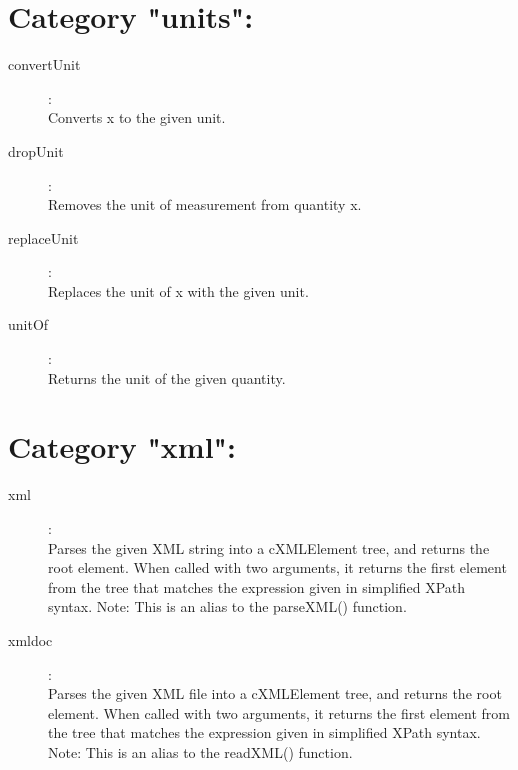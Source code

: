 \section{Category "units":}
\label{sec:ned-functions:category-units}

\begin{description}
\item[convertUnit]:  \\
    Converts x to the given unit.

\item[dropUnit]:  \\
    Removes the unit of measurement from quantity x.

\item[replaceUnit]:  \\
    Replaces the unit of x with the given unit.

\item[unitOf]:  \\
    Returns the unit of the given quantity.


\end{description}

\section{Category "xml":}
\label{sec:ned-functions:category-xml}

\begin{description}
\item[xml]:  \\
    Parses the given XML string into a cXMLElement tree, and returns the root
    element. When called with two arguments, it returns the first element from
    the tree that matches the expression given in simplified XPath syntax.
    Note: This is an alias to the parseXML() function.

\item[xmldoc]:  \\
    Parses the given XML file into a cXMLElement tree, and returns the root
    element. When called with two arguments, it returns the first element from
    the tree that matches the expression given in simplified XPath syntax.
    Note: This is an alias to the readXML() function.


\end{description}


